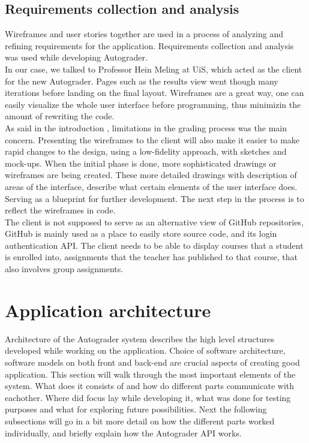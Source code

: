 \subsection{Requirements collection and analysis}

Wireframes and user stories together are used in a process of analyzing and refining requirements for the application. Requirements collection and analysis was used while developing Autograder. 
\\In our case, we talked to Professor Hein Meling at UiS, which acted as the client for the new Autograder. Pages such as the results view  went though many iterations before landing on the final layout. Wireframes are a great way, one can easily visualize the whole user interface before programming, thus minimizin the amount of rewriting the code.
\\As said in the introduction , limitations in the grading process was the main concern. Presenting the wireframes to the client will also make it easier to make rapid changes to the design, using a low-fidelity approach, with sketches and mock-ups. When the initial phase is done, more sophisticated drawings or wireframes are being created. These more detailed drawings with description of areas of the interface, describe what certain elements of the user interface does. Serving as a blueprint for further development. The next step in the process is to reflect the wireframes in code.
\\The client is not supposed to serve as an alternative view of GitHub repositories, GitHub is mainly used as a place to easily store source code, and its login authentication API. The client needs to be able to display courses that a student is enrolled into, assignments that the teacher has published to that course, that also involves group assignments.

\section{Application architecture}
Architecture of the Autograder system describes the high level structures developed while working on the application. Choice of software architecture, software models on both front and back-end are crucial aspects of creating good application. This section will walk through the most important elements of the system. What does it consists of and how do different parts communicate with eachother. Where did focus lay while developing it, what was done for testing purposes and what for exploring future possibilities. Next the following subsections will go in a bit more detail on how the different parts worked individually, and briefly explain how the Autograder API works.

